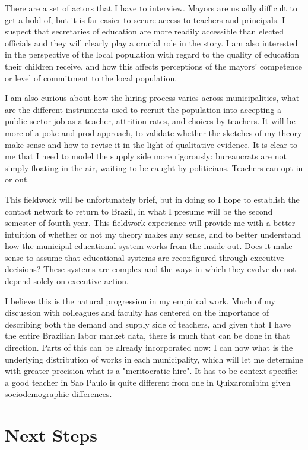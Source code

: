 \documentclass[12pt,a4paper]{article}
\begin{document}
There are a set of actors that I have to interview. Mayors are usually difficult to get a hold of, but it is far easier to secure access to teachers and principals. I suspect that secretaries of education are more readily accessible than elected officials and they will clearly play a crucial role in the story. I am also interested in the perspective of the local population with regard to the quality of education their children receive, and how this affects perceptions of the mayors' competence or level of commitment to the local population. 

I am also curious about how the hiring process varies across municipalities, what are the different instruments used to recruit the population into accepting a public sector job as a teacher, attrition rates, and choices by teachers. It will be more of a poke and prod approach, to validate whether the sketches of my theory make sense and how to revise it in the light of qualitative evidence. It is clear to me that I need to model the supply side more rigorously: bureaucrats are not simply floating in the air, waiting to be caught by politicians. Teachers can opt in or out.

This fieldwork will be unfortunately brief, but in doing so I hope to establish the contact network to return to Brazil, in what I presume will be the second semester of fourth year. This fieldwork experience will provide me with a better intuition of whether or not my theory makes any sense, and to better understand how the municipal educational system works from the inside out. Does it make sense to assume that educational systems are reconfigured through executive decisions? These systems are complex and the ways in which they evolve do not depend solely on executive action.

I believe this is the natural progression in my empirical work. Much of my discussion with colleagues and faculty has centered on the importance of describing both the demand and supply side of teachers, and given that I have the entire Brazilian labor market data, there is much that can be done in that direction. Parts of this can be already incorporated now: I can now what is the underlying distribution of works in each municipality, which will let me determine with greater precision what is a "meritocratic hire". It has to be context specific: a good teacher in Sao Paulo is quite different from one in Quixaromibim given sociodemographic differences.

\section{Next Steps}
\end{document}
